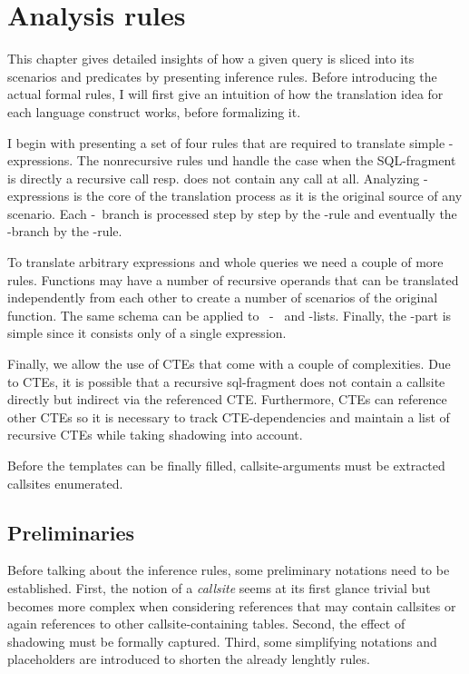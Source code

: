 \chapter{Analysis rules}

This chapter gives detailed insights of how a given query is sliced into its scenarios and predicates by presenting inference rules. Before introducing the actual formal rules, I will first give an intuition of how the translation idea for each language construct works, before formalizing it.

I begin with presenting a set of four rules that are required to translate simple \CASE-expressions. The nonrecursive rules \RREC und \RBASE handle the case when the SQL-fragment is directly a recursive call resp. does not contain any call at all. Analyzing \CASE-expressions is the core of the translation process as it is the original source of any scenario. Each \WHEN-\THEN~branch is processed step by step by the \RWHEN-rule and eventually the \ELSE-branch by the \RELSE-rule.

To translate arbitrary expressions and whole queries we need a couple of more rules. Functions may have a number of recursive operands that can be translated independently from each other to create a number of scenarios of the original function. The same schema can be applied to ~\SELECT-~ and \FROM-lists. Finally, the \WHERE-part is simple since it consists only of a single expression.

Finally, we allow the use of CTEs that come with a couple of complexities. Due to CTEs, it is possible that a recursive sql-fragment does not contain a callsite directly but indirect via the referenced CTE. Furthermore, CTEs can reference other CTEs so it is necessary to track CTE-dependencies and maintain a list of recursive CTEs while taking shadowing into account.

Before the templates can be finally filled, callsite-arguments must be extracted callsites enumerated.

\section{Preliminaries}\label{approach}

Before talking about the inference rules, some preliminary notations need to be established. First, the notion of a \textit{callsite} seems at its first glance trivial but becomes more complex when considering references that may contain callsites or again references to other callsite-containing tables. Second, the effect of shadowing must be formally captured. Third, some simplifying notations and placeholders are introduced to shorten the already lenghtly rules.

